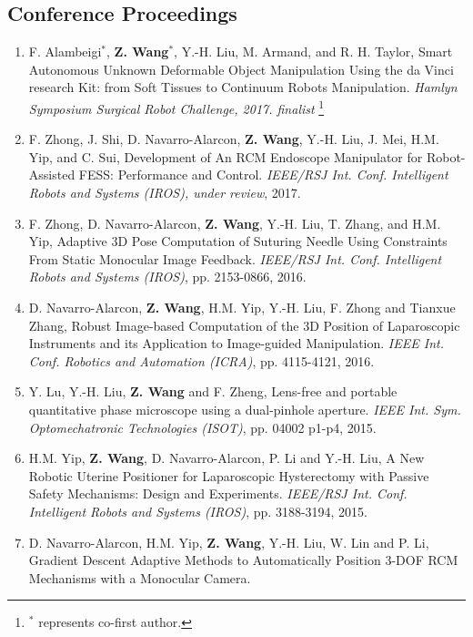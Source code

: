 \documentclass[10pt,letterpaper]{article}
\begin{document}
    \subsection*{Conference Proceedings}
    \begin{enumerate}
        \item F. Alambeigi$^*$, \textbf{Z. Wang}$^*$, Y.-H. Liu, M. Armand, and R. H. Taylor,
        Smart Autonomous Unknown Deformable Object Manipulation Using the da Vinci research Kit: from Soft Tissues to Continuum Robots Manipulation.
        \textit{Hamlyn Symposium Surgical Robot Challenge, 2017. finalist}
        \let\thefootnote\relax\footnote{$^*$ represents co-first author.}
        \item F. Zhong, J. Shi, D. Navarro-Alarcon, \textbf{Z. Wang}, Y.-H. Liu, J. Mei, H.M. Yip, and C. Sui,
        Development of An RCM Endoscope Manipulator for Robot-Assisted FESS: Performance and Control.
        \textit{{IEEE/RSJ} Int. Conf. Intelligent Robots and Systems (IROS), under review}, 2017.
        \item F. Zhong, D. Navarro-Alarcon, \textbf{Z. Wang}, Y.-H. Liu, T. Zhang, and H.M. Yip,
        Adaptive 3D Pose Computation of Suturing Needle Using Constraints From Static Monocular Image Feedback.
        \textit{{IEEE/RSJ} Int. Conf. Intelligent Robots and Systems (IROS)}, pp. 2153-0866, 2016.
        \item D. Navarro-Alarcon, \textbf{Z. Wang}, H.M. Yip, Y.-H. Liu, F. Zhong and Tianxue Zhang,
        Robust Image-based Computation of the 3D Position of Laparoscopic Instruments and its Application to Image-guided Manipulation.
        \textit{{IEEE} Int. Conf. Robotics and Automation (ICRA)}, pp. 4115-4121, 2016.
        \item Y. Lu, Y.-H. Liu, \textbf{Z. Wang} and F. Zheng,
        Lens-free and portable quantitative phase microscope using a dual-pinhole aperture.
        \textit{{IEEE} Int. Sym. Optomechatronic Technologies (ISOT)}, pp. 04002 p1-p4, 2015.
        \item H.M. Yip, \textbf{Z. Wang}, D. Navarro-Alarcon, P. Li and Y.-H. Liu,
        A New Robotic Uterine Positioner for Laparoscopic Hysterectomy with Passive Safety Mechanisms: Design and Experiments.
        \textit{{IEEE/RSJ} Int. Conf. Intelligent Robots and Systems (IROS)}, pp. 3188-3194, 2015.
        \item D. Navarro-Alarcon, H.M. Yip, \textbf{Z. Wang}, Y.-H. Liu, W. Lin and P. Li,
        Gradient Descent Adaptive Methods to Automatically Position 3-DOF RCM Mechanisms with a Monocular Camera.

\end{enumerate}
\end{document}
